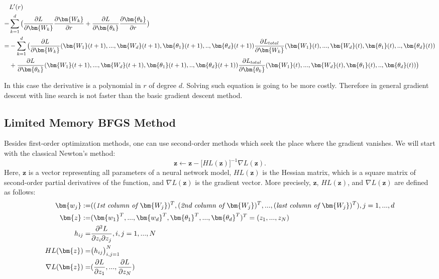 \begin{equation}
\aligned
&L'(r)\\ =& \sum_{k=1}^d \big(\frac{\partial L}{\partial \bm{W_k}}\frac{\partial \bm{W_k}}{\partial r} + \frac{\partial L}{\partial \bm{\theta_k}}\frac{\partial \bm{\theta_k}}{\partial r}\big)\\
=& -\sum_{k=1}^d\big(\frac{\partial L}{\partial \bm{W_k}}(\bm{W_1}(t+1),...,\bm{W_d}(t+1),\bm{\theta_1}(t+1),..,\bm{\theta_d}(t+1))\frac{\partial L_{total}}{\partial \bm{W_k}}(\bm{W_1}(t),...,\bm{W_d}(t),\bm{\theta_1}(t),..,\bm{\theta_d}(t))\\
 &+ \frac{\partial L}{\partial \bm{\theta_k}}(\bm{W_1}(t+1),...,\bm{W_d}(t+1),\bm{\theta_1}(t+1),..,\bm{\theta_d}(t+1))\frac{\partial L_{total}}{\partial \bm{\theta_k}}(\bm{W_1}(t),...,\bm{W_d}(t),\bm{\theta_1}(t),..,\bm{\theta_d}(t))\big)
\endaligned
\end{equation}

In this case the derivative is a polynomial in $r$ of degree $d$. Solving such equation is going to be more costly. Therefore in general gradient descent with line search is not faster than the basic gradient descent method.

 
\subsection{Limited Memory BFGS Method}

Besides first-order optimization methods, one can use second-order methods which seek the place where the gradient vanishes. We will start with the classical Newton's method:
\begin{equation}
\bm{z} \leftarrow \bm{z} - \big[HL(\bm{z})\big]^{-1}\nabla L(\bm{z}).
\end{equation}
Here, $\bm{z}$ is a vector representing all parameters of a neural network model, $HL(\bm{z})$ is the Hessian matrix, which is a square matrix of second-order partial derivatives of the function, and $\nabla L(\bm{z})$ is the gradient vector. More precisely, $\bm{z}$, $HL(\bm{z})$, and $\nabla L(\bm{z})$ are defined as follows:
\begin{equation}
\aligned
\bm{w_j} :=& ((\textit{1st column of }\bm{W_j})^T, (\textit{2nd column of }\bm{W_j})^T,..., (\textit{last column of }\bm{W_j})^T), j=1,...,d\\
\bm{z} :=& (\bm{w_1}^T,..., \bm{w_d}^T, \bm{\theta_1}^T,...,\bm{\theta_d}^T)^T = (z_1,...,z_N)\\
h_{ij} =& \frac{\partial^2 L}{\partial z_i \partial z_j}, i,j=1,...,N\\
HL(\bm{z}) =& \big(h_{ij}\big)_{i,j=1}^N\\
\nabla L(\bm{z}) =& (\frac{\partial L}{\partial z_1},...,\frac{\partial L}{\partial z_N})
\endaligned
\end{equation}


